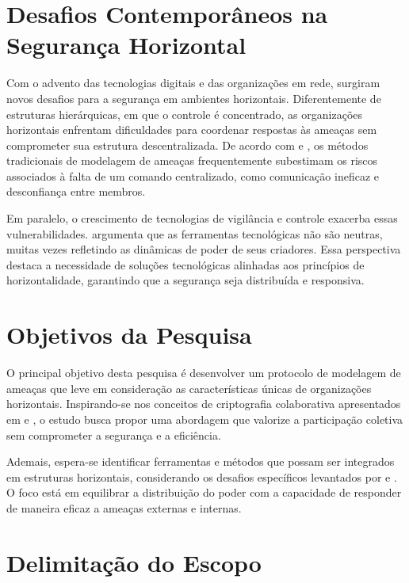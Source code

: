 \section{Desafios Contemporâneos na Segurança Horizontal}
\label{sec:desafios-contemporaneos}

Com o advento das tecnologias digitais e das organizações em
rede, surgiram novos desafios para a segurança em ambientes
horizontais. Diferentemente de estruturas hierárquicas, em
que o controle é concentrado, as organizações horizontais
enfrentam dificuldades para coordenar respostas às ameaças
sem comprometer sua estrutura descentralizada. De acordo com
\cite{ThreatModelingASummaryOfAvailableMethods} e
\cite{ParticipatoryThreatModelling}, os métodos tradicionais
de modelagem de ameaças frequentemente subestimam os riscos
associados à falta de um comando centralizado, como
comunicação ineficaz e desconfiança entre membros.

Em paralelo, o crescimento de tecnologias de vigilância e
controle exacerba essas vulnerabilidades.
\cite{DoArtifactsHavePolitics} argumenta que as ferramentas
tecnológicas não são neutras, muitas vezes refletindo as
dinâmicas de poder de seus criadores. Essa perspectiva
destaca a necessidade de soluções tecnológicas alinhadas aos
princípios de horizontalidade, garantindo que a segurança
seja distribuída e responsiva.

\section{Objetivos da Pesquisa}
\label{sec:objetivos-pesquisa}

O principal objetivo desta pesquisa é desenvolver um
protocolo de modelagem de ameaças que leve em consideração
as características únicas de organizações horizontais.
Inspirando-se nos conceitos de criptografia colaborativa
apresentados em \cite{AbcCrypto} e \cite{Colbac}, o estudo
busca propor uma abordagem que valorize a participação
coletiva sem comprometer a segurança e a eficiência.

Ademais, espera-se identificar ferramentas e métodos que
possam ser integrados em estruturas horizontais,
considerando os desafios específicos levantados por
\cite{Non-HierarchicalForms} e
\cite{WorkerCooperativesandRevolution}. O foco está em
equilibrar a distribuição do poder com a capacidade de
responder de maneira eficaz a ameaças externas e internas.

\section{Delimitação do Escopo}
\label{sec:delimitacao-escopo}

